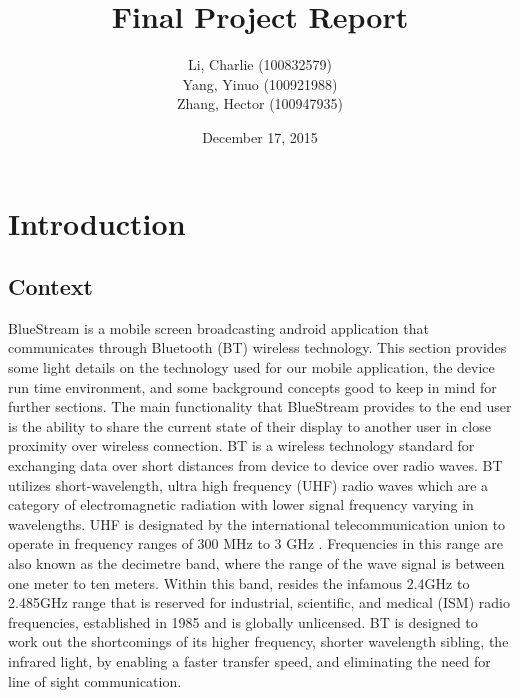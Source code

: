 \documentclass[a4paper,12pt]{article}
\title{Final Project Report}
\author{Li, Charlie (100832579) \\ Yang, Yinuo (100921988) \\ Zhang, Hector (100947935) }
\date{December 17, 2015}
\begin{document}
\null  %
\nointerlineskip  %
\vfill
\let\snewpage \newpage
\let\newpage \relax
\maketitle
\let \newpage \snewpage
\vfill 
\break %
\tableofcontents
\newpage
\section{Introduction}

\subsection{Context}
BlueStream is a mobile screen broadcasting android application that communicates through Bluetooth (BT) wireless technology. This section provides some light details on the technology used for our mobile application, the device run time environment, and some background concepts good to keep in mind for further sections. The main functionality that BlueStream provides to the end user is the ability to share the current state of their display to another user in close proximity over wireless connection. BT is a wireless technology standard for exchanging data over short distances from device to device over radio waves. BT utilizes short-wavelength, ultra high frequency (UHF) radio waves which are a category of electromagnetic radiation with lower signal frequency varying in wavelengths. UHF is designated by the international telecommunication union to operate in frequency ranges of 300 MHz to 3 GHz \cite{UHFwave}. Frequencies in this range are also known as the decimetre band, where the range of the wave signal is between one meter to ten meters. Within this band, resides the infamous 2.4GHz to 2.485GHz range that is reserved for industrial, scientific, and medical (ISM) radio frequencies, established in 1985 and is globally unlicensed. BT is designed to work out the shortcomings of its higher frequency, shorter wavelength sibling, the infrared light, by enabling a faster transfer speed, and eliminating the need for line of sight communication.
\end{document}
